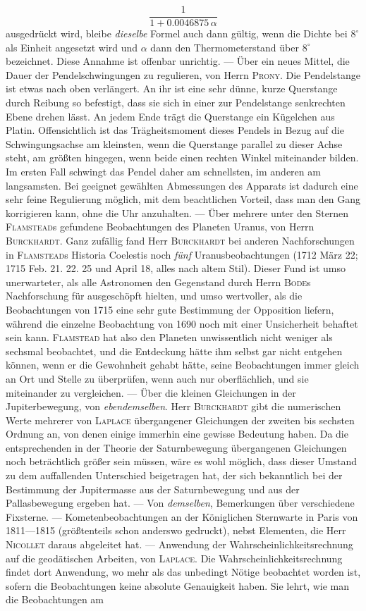 \[
\frac{1}{1+0.0046875\,\alpha}
\]
 ausgedrückt wird, bleibe \emph{dieselbe} Formel auch dann gültig, wenn die Dichte bei $8^\circ$ als Einheit angesetzt wird und $\alpha$ dann den Thermometerstand über $8^\circ$ bezeichnet. Diese Annahme ist offenbar unrichtig. --- Über ein neues Mittel, die Dauer der Pendelschwingungen zu regulieren, von Herrn \textsc{Prony}. Die Pendelstange ist etwas nach oben verlängert. An ihr ist eine sehr dünne, kurze Querstange durch Reibung so befestigt, dass sie sich in einer zur Pendelstange senkrechten Ebene drehen lässt. An jedem Ende trägt die Querstange ein Kügelchen aus Platin. Offensichtlich ist das Trägheitsmoment dieses Pendels in Bezug auf die Schwingungsachse am kleinsten, wenn die Querstange parallel zu dieser Achse steht, am größten hingegen, wenn beide einen rechten Winkel miteinander bilden. Im ersten Fall schwingt das Pendel daher am schnellsten, im anderen am langsamsten. Bei geeignet gewählten Abmessungen des Apparats ist dadurch eine sehr feine Regulierung möglich, mit dem beachtlichen Vorteil, dass man den Gang korrigieren kann, ohne die Uhr anzuhalten. --- Über mehrere unter den Sternen \textsc{Flamstead}s gefundene Beobachtungen des Planeten Uranus, von Herrn \textsc{Burckhardt}. Ganz zufällig fand Herr \textsc{Burckhardt} bei anderen Nachforschungen in \textsc{Flamstead}s Historia Coelestis noch \emph{fünf} Uranusbeobachtungen (1712 März 22; 1715 Feb. 21. 22. 25 und April 18, alles nach altem Stil). Dieser Fund ist umso unerwarteter, als alle Astronomen den Gegenstand durch Herrn \textsc{Bode}s Nachforschung für ausgeschöpft hielten, und umso wertvoller, als die Beobachtungen von 1715 eine sehr gute Bestimmung der Opposition liefern, während die einzelne Beobachtung von 1690 noch mit einer Unsicherheit behaftet sein kann. \textsc{Flamstead} hat also den Planeten unwissentlich nicht weniger als sechsmal beobachtet, und die Entdeckung hätte ihm selbst gar nicht entgehen können, wenn er die Gewohnheit gehabt hätte, seine Beobachtungen immer gleich an Ort und Stelle zu überprüfen, wenn auch nur oberflächlich, und sie miteinander zu vergleichen. --- Über die kleinen Gleichungen in der Jupiterbewegung, von \emph{ebendemselben}. Herr \textsc{Burckhardt} gibt die numerischen Werte mehrerer von \textsc{Laplace} übergangener Gleichungen der zweiten bis sechsten Ordnung an, von denen einige immerhin eine gewisse Bedeutung haben. Da die entsprechenden in der Theorie der Saturnbewegung übergangenen Gleichungen noch beträchtlich größer sein müssen, wäre es wohl möglich, dass dieser Umstand zu dem auffallenden Unterschied beigetragen hat, der sich bekanntlich bei der Bestimmung der Jupitermasse aus der Saturnbewegung und aus der Pallasbewegung ergeben hat. --- Von \emph{demselben}, Bemerkungen über verschiedene Fixsterne. --- Kometenbeobachtungen an der Königlichen Sternwarte in Paris von 1811---1815 (größtenteils schon anderswo gedruckt), nebst Elementen, die Herr \textsc{Nicollet} daraus abgeleitet hat. --- Anwendung der Wahrscheinlichkeitsrechnung auf die geodätischen Arbeiten, von \textsc{Laplace}. Die Wahrscheinlichkeitsrechnung findet dort Anwendung, wo mehr als das unbedingt Nötige beobachtet worden ist, sofern die Beobachtungen keine absolute Genauigkeit haben. Sie lehrt, wie man die Beobachtungen am 